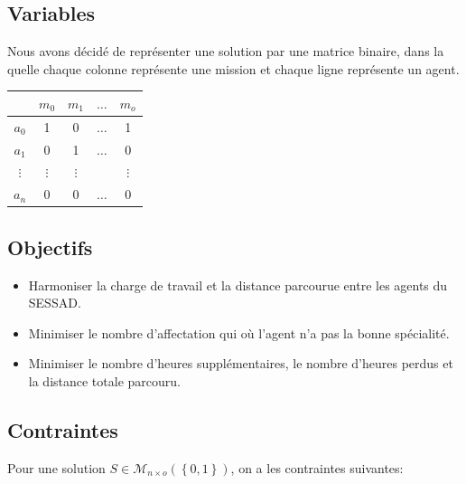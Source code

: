 \documentclass[11pt]{article}
\begin{document}
\subsection{Variables}





Nous avons décidé de représenter une solution par une matrice binaire, dans la quelle chaque colonne représente une mission et chaque ligne représente un agent.

\begin{center}
\begin{tabular}{|c|c c c c|}
\hline
    & $m_0$ & $m_1$ & $\dots$ & $m_o$ \\\hline
    $a_0$ & 1 & 0 & $\dots$ & 1 \\
    $a_1$ & 0 & 1 & $\dots$ & 0 \\
    $\vdots$ & $\vdots$ & $\vdots$ & & $\vdots$\\
    $a_n$ & 0 & 0 & $\dots$ & 0 \\\hline
\end{tabular}
\end{center}


\subsection{Objectifs}


\begin{itemize}
    \item Harmoniser la charge de travail et la distance parcourue entre les agents du SESSAD.
    \item Minimiser le nombre d'affectation qui où l'agent n'a pas la bonne spécialité.
    \item Minimiser le nombre d'heures supplémentaires, le nombre d'heures perdus et la distance totale parcouru.
\end{itemize}



\subsection{Contraintes}


Pour une solution $S \in \mathcal{M}_{n \times o}(\left\{0, 1\right\})$, on a les contraintes suivantes:
\end{document}
